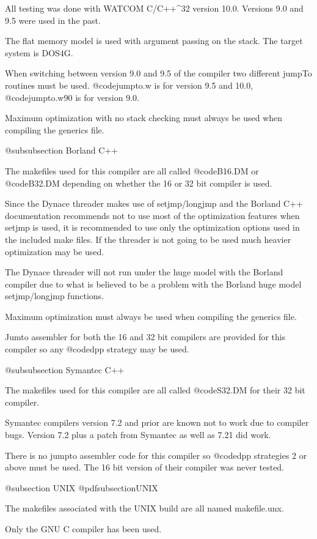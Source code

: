 All testing was done with WATCOM C/C++^32 version 10.0.
Versions 9.0 and 9.5 were used in the past.

The flat memory model is used with argument passing on the stack.  The
target system is DOS4G.  

When switching between version 9.0 and 9.5 of the compiler two different
jumpTo routines must be used.  @code{jumpto.w} is for version 9.5 and
10.0, @code{jumpto.w90} is for version 9.0.

Maximum optimization with no stack checking must always be used when
compiling the generics file.

@subsubsection Borland C++

The makefiles used for this compiler are all called @code{B16.DM} or
@code{B32.DM} depending on whether the 16 or 32 bit compiler is used.

Since the Dynace threader makes use of setjmp/longjmp and the Borland C++
documentation recommends not to use most of the optimization features
when setjmp is used, it is recommended to use only the optimization
options used in the included make files.  If the threader is not going
to be used much heavier optimization may be used.

The Dynace threader will not run under the huge model with the Borland
compiler due to what is believed to be a problem with the Borland
huge model setjmp/longjmp functions.

Maximum optimization must always be used when compiling the generics
file.

Jumto assembler for both the 16 and 32 bit compilers are provided for
this compiler so any @code{dpp} strategy may be used.

@subsubsection Symantec C++

The makefiles used for this compiler are all called 
@code{S32.DM} for their 32 bit compiler.

Symantec compilers version 7.2 and prior are known not to work due to
compiler bugs.  Version 7.2 plus a patch from Symantec as well as 7.21
did work.

There is no jumpto assembler code for this compiler so @code{dpp}
strategies 2 or above must be used.  The 16 bit version of their
compiler was never tested.

@subsection UNIX
@pdfsubsection{UNIX}

The makefiles associated with the UNIX build are all named makefile.unx.

Only the GNU C compiler has been used.

